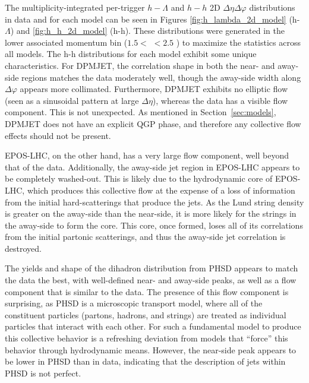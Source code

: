 The multiplicity-integrated per-trigger $h-\Lambda$ and $h-h$ 2D $\Delta\eta\Delta\varphi$ distributions in data and for each model can be seen in Figures \ref{fig:h_lambda_2d_model} (h-$\Lambda$) and \ref{fig:h_h_2d_model} (h-h). These distributions were generated in the lower associated momentum bin ($1.5 <$ \pt $< 2.5$ \GeVc) to maximize the statistics across all models. The h-h distributions for each model exhibit some unique characteristics. For DPMJET, the correlation shape in both the near- and away-side regions matches the data moderately well, though the away-side width along $\Delta\varphi$ appears more collimated. Furthermore, DPMJET exhibits no elliptic flow (seen as a sinusoidal pattern at large $\Delta\eta$), whereas the data has a visible flow component. This is not unexpected. As mentioned in Section~\ref{sec:models}, DPMJET does not have an explicit QGP phase, and therefore any collective flow effects should not be present. 

EPOS-LHC, on the other hand, has a very large flow component, well beyond that of the data. Additionally, the away-side jet region in EPOS-LHC appears to be completely washed-out. This is likely due to the hydrodynamic core of EPOS-LHC, which produces this collective flow at the expense of a loss of information from the initial hard-scatterings that produce the jets. As the Lund string density is greater on the away-side than the near-side, it is more likely for the strings in the away-side to form the core. This core, once formed, loses all of its correlations from the initial partonic scatterings, and thus the away-side jet correlation is destroyed. 

The yields and shape of the dihadron distribution from PHSD appears to match the data the best, with well-defined near- and away-side peaks, as well as a flow component that is similar to the data. The presence of this flow component is surprising, as PHSD is a microscopic transport model, where all of the constituent particles (partons, hadrons, and strings) are treated as individual particles that interact with each other. For such a fundamental model to produce this collective behavior is a refreshing deviation from models that ``force'' this behavior through hydrodynamic means. However, the near-side peak appears to be lower in PHSD than in data, indicating that the description of jets within PHSD is not perfect.

